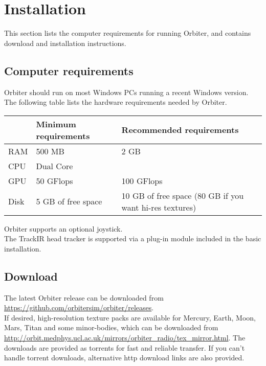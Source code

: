 \documentclass[Orbiter User Manual.tex]{subfiles}
\begin{document}
\section{Installation}
\label{sec:installation}
This section lists the computer requirements for running Orbiter, and contains download and installation instructions.

\subsection{Computer requirements}
Orbiter should run on most Windows PCs running a recent Windows version.\\
The following table lists the hardware requirements needed by Orbiter.

	\begin{longtable}{ |p{}|p{}|p{}| }
	\hline\rule{0pt}{2ex}
	& \textbf{Minimum requirements} & \textbf{Recommended requirements}\\
	\hline\rule{0pt}{2ex}
	RAM & 500 MB & 2 GB\\
	\hline\rule{0pt}{2ex}
	CPU & Dual Core &\\
	\hline\rule{0pt}{2ex}
	GPU & 50 GFlops & 100 GFlops\\
	\hline\rule{0pt}{2ex}
	Disk & 5 GB of free space & 10 GB of free space (80 GB if you want hi-res textures)\\
	\hline
	\end{longtable}

\noindent
Orbiter supports an optional joystick.\\
The TrackIR head tracker is supported via a plug-in module included in the basic installation.

\subsection{Download}
The latest Orbiter release can be downloaded from \url{https://github.com/orbitersim/orbiter/releases}.\\
If desired, high-resolution texture packs are available for Mercury, Earth, Moon, Mars, Titan and some minor-bodies, which can be downloaded from \url{http://orbit.medphys.ucl.ac.uk/mirrors/orbiter_radio/tex_mirror.html}. The downloads are provided as torrents for fast and reliable transfer. If you can't handle torrent downloads, alternative http download links are also provided.
\end{document}
